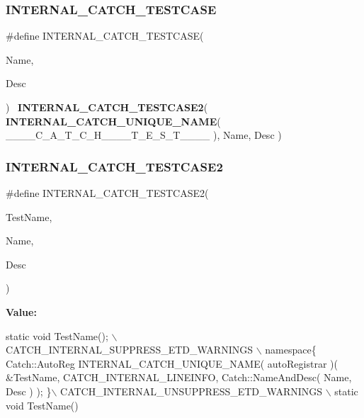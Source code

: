 \subsubsection{I\+N\+T\+E\+R\+N\+A\+L\+\_\+\+C\+A\+T\+C\+H\+\_\+\+T\+E\+S\+T\+C\+A\+SE}
{\footnotesize\ttfamily \#define I\+N\+T\+E\+R\+N\+A\+L\+\_\+\+C\+A\+T\+C\+H\+\_\+\+T\+E\+S\+T\+C\+A\+SE(\begin{DoxyParamCaption}\item[{}]{Name,  }\item[{}]{Desc }\end{DoxyParamCaption})~\textbf{ I\+N\+T\+E\+R\+N\+A\+L\+\_\+\+C\+A\+T\+C\+H\+\_\+\+T\+E\+S\+T\+C\+A\+S\+E2}( \textbf{ I\+N\+T\+E\+R\+N\+A\+L\+\_\+\+C\+A\+T\+C\+H\+\_\+\+U\+N\+I\+Q\+U\+E\+\_\+\+N\+A\+ME}( \+\_\+\+\_\+\+\_\+\+\_\+\+C\+\_\+\+A\+\_\+\+T\+\_\+\+C\+\_\+\+H\+\_\+\+\_\+\+\_\+\+\_\+\+T\+\_\+\+E\+\_\+\+S\+\_\+\+T\+\_\+\+\_\+\+\_\+\+\_\+ ), Name, Desc )}

\mbox{\label{catch_8hpp_ab4059fa3e4a47e9475c1056e6808d144}} 
\subsubsection{I\+N\+T\+E\+R\+N\+A\+L\+\_\+\+C\+A\+T\+C\+H\+\_\+\+T\+E\+S\+T\+C\+A\+S\+E2}
{\footnotesize\ttfamily \#define I\+N\+T\+E\+R\+N\+A\+L\+\_\+\+C\+A\+T\+C\+H\+\_\+\+T\+E\+S\+T\+C\+A\+S\+E2(\begin{DoxyParamCaption}\item[{}]{Test\+Name,  }\item[{}]{Name,  }\item[{}]{Desc }\end{DoxyParamCaption})}

{\bfseries Value\+:}
\begin{DoxyCode}
\textcolor{keyword}{static} \textcolor{keywordtype}{void} TestName(); \(\backslash\)
        CATCH\_INTERNAL\_SUPPRESS\_ETD\_WARNINGS \(\backslash\)
        namespace\{ Catch::AutoReg INTERNAL_CATCH_UNIQUE_NAME( autoRegistrar )( &TestName, 
      CATCH_INTERNAL_LINEINFO, Catch::NameAndDesc( Name, Desc ) ); \}\(\backslash\)
        CATCH\_INTERNAL\_UNSUPPRESS\_ETD\_WARNINGS \(\backslash\)
        static \textcolor{keywordtype}{void} TestName()
\end{DoxyCode}
\mbox{\label{catch_8hpp_aa3bf107b026a23c19a0fd44442790114}} 
